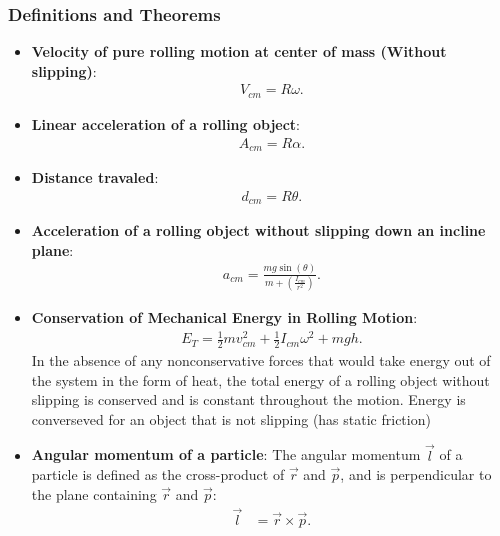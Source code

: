 \documentclass{report}
\begin{document}
    \subsubsection{Definitions and Theorems}
    \begin{itemize}
        \item \textbf{Velocity of pure rolling motion at center of mass (Without slipping)}: 
            \begin{align*}
                V_{cm} = R\omega
            .\end{align*}
        \item \textbf{Linear acceleration of a rolling object}:
            \begin{align*}
                A_{cm} = R\alpha
            .\end{align*}
        \item \textbf{Distance travaled}:
            \begin{align*}
                d_{cm} = R\theta
            .\end{align*}
        \item \textbf{Acceleration of a rolling object without slipping down an incline plane}:
            \begin{align*}
                a_{cm} = \frac{mg\sin{\left(\theta \right)}}{m+  \left(\frac{I_{cm}}{r^{2}}\right)}
            .\end{align*}
        \item \textbf{Conservation of Mechanical Energy in Rolling Motion}:
            \begin{align*}
                E_{T} = \frac{1}{2}mv^{2}_{cm} + \frac{1}{2}I_{cm}\omega^{2} + mgh
            .\end{align*}
            \bigbreak \noindent 
            In the absence of any nonconservative forces that would take energy out of the system in the form of heat, the total energy of a rolling object without slipping is conserved and is constant throughout the motion.
            \bigbreak \noindent 
            Energy is converseved for an object that is not slipping (has static friction)
        \item \textbf{Angular momentum of a particle}:
            The angular momentum $\vec{l}$ of a particle is defined as the cross-product of $\vec{r}$ and $\vec{p}$, and is perpendicular to the plane containing $\vec{r}$ and $\vec{p}$:
            \begin{align*}
                \vec{l} &= \vec{r} \times \vec{p}. \\

\end{align*}
\end{itemize}
\end{document}
